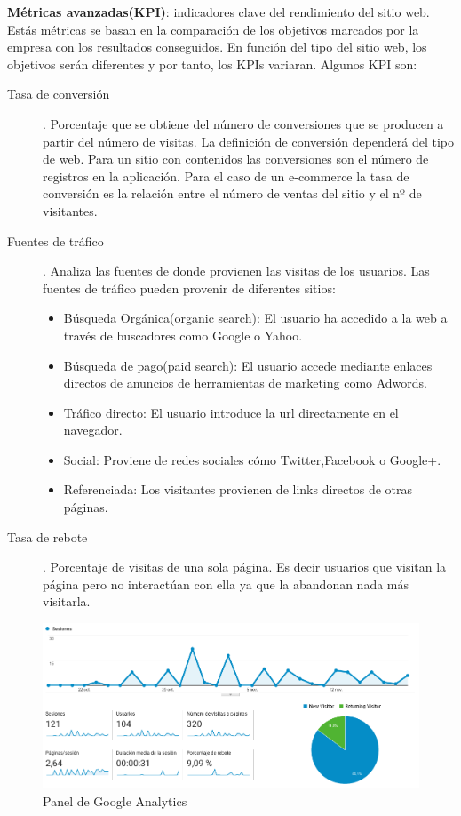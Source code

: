 \vspace{5 mm}

\textbf{Métricas avanzadas(KPI)}: indicadores clave del rendimiento del sitio web. Estás métricas se basan en la comparación de los objetivos marcados por la empresa con los resultados conseguidos. En función del tipo del sitio web, los objetivos serán diferentes y por tanto, los KPIs variaran. Algunos KPI son:

\begin{description}


\item [Tasa de conversión]. Porcentaje que se obtiene del número de conversiones que se producen a partir del número de visitas. La definición de conversión dependerá del tipo de web. Para un sitio con contenidos las conversiones son el número de registros en la aplicación. Para el caso de un e-commerce la tasa de conversión es la relación entre el número de ventas del sitio y el nº de visitantes.

\item [Fuentes de tráfico]. Analiza las fuentes de donde provienen las visitas de los usuarios. Las fuentes de tráfico pueden provenir de diferentes sitios:

\begin{itemize}
\item Búsqueda Orgánica(organic search): El usuario ha accedido a la web a través de buscadores como Google o Yahoo.
\item Búsqueda de pago(paid search): El usuario accede mediante enlaces directos de anuncios de herramientas de marketing como Adwords.
\item Tráfico directo: El usuario introduce la url directamente en el navegador.
\item Social: Proviene de redes sociales cómo Twitter,Facebook o Google+.
\item Referenciada: Los visitantes provienen de links directos de otras páginas.
\end{itemize}

\item [Tasa de rebote]. Porcentaje de visitas de una sola página. Es decir usuarios que visitan la página pero no interactúan con ella ya que la abandonan nada más visitarla.
\end{description}

\begin{figure}
\begin{center}
\includegraphics[width=1.0\textwidth]{imagenes/analytics.png}
\caption{Panel de Google Analytics}
\label{analytics}
\end{center}
\end{figure}

